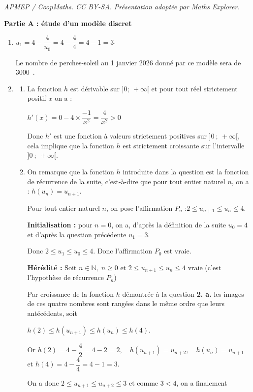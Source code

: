 \documentclass[10pt]{article}
\providecommand{\N}{\mathbb{N}}
\providecommand{\np}[2][]{{#2~#1}}
\begin{document}
\noindent\textit{APMEP / CoopMaths. CC BY-SA. Présentation adaptée par Maths Explorer.}\par\medskip
\textbf{Partie A : étude d'un modèle discret}
	
	\begin{enumerate}
	\item $u_{1}=4-\dfrac{4}{u_{0}}= 4 - \dfrac{4}{4}=4-1=3$.

Le nombre de perches-soleil au 1 janvier 2026 donné par ce modèle sera de \np{3000}.

\item 
	\begin{enumerate}
		\item La fonction $h$ est dérivable sur $] 0;~+\infty[$ et pour tout réel strictement positif $x$ on a :

$h'(x) = 0 -4 \times \dfrac{-1}{x^2}= \dfrac{4}{x^2} > 0$

Donc $h'$ est une fonction à valeurs strictement positives sur $]0~;~+\infty[$, cela implique que la fonction $h$ est strictement croissante sur l'intervalle $]0~;~+\infty[$.
		\item On remarque que la fonction $h$ introduite dans la question est la fonction de récurrence de la suite, c'est-à-dire que pour tout entier naturel $n$, on a : \quad $h(u_n) = u_{n+1}$.

Pour tout entier naturel $n$, on pose l'affirmation $P_n$ :\quad \og $2 \leqslant u_{n+1} \leqslant u_{n} \leqslant 4$.\fg{}

\textbf{Initialisation : } pour $n = 0$, on a, d'après la définition de la suite $u_0 = 4$ et d'après la question précédente $u_1 = 3$.

Donc \quad $2 \leqslant u_1 \leqslant u_0 \leqslant 4$. \quad Donc l'affirmation $P_0$ est vraie.

\textbf{Hérédité :} Soit $n\in \N, \; n \geqslant 0$ et $2 \leqslant u_{n+1} \leqslant u_{n} \leqslant 4$ vraie (c'est l'hypothèse de récurrence $P_n$)

Par croissance de la fonction $h$ démontrée à la question \textbf{2. a.} les images de ces quatre nombres sont rangées dans le même ordre que leurs antécédents, soit

$h(2) \leqslant h(u_{n+1}) \leqslant h(u_n) \leqslant h(4)$.

Or $h(2) = 4 - \dfrac42  = 4 - 2 = 2, \quad h(u_{n+1}) = u_{n+2}, \quad h(u_n) = u_{n+1}$ et \quad $h(4) = 4 - \dfrac 44 = 4 - 1 = 3$.

On a donc $2 \leqslant u_{n+1} \leqslant u_{n+2} \leqslant 3$ et comme $3 < 4$, on a finalement 


\end{enumerate}
\end{enumerate}
\end{document}
